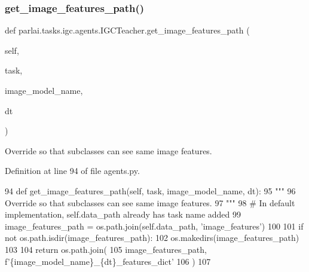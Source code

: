 \subsubsection{\texorpdfstring{get\+\_\+image\+\_\+features\+\_\+path()}{get\_image\_features\_path()}}
{\footnotesize\ttfamily def parlai.\+tasks.\+igc.\+agents.\+I\+G\+C\+Teacher.\+get\+\_\+image\+\_\+features\+\_\+path (\begin{DoxyParamCaption}\item[{}]{self,  }\item[{}]{task,  }\item[{}]{image\+\_\+model\+\_\+name,  }\item[{}]{dt }\end{DoxyParamCaption})}

\begin{DoxyVerb}Override so that subclasses can see same image features.
\end{DoxyVerb}
 

Definition at line 94 of file agents.\+py.


\begin{DoxyCode}
94     \textcolor{keyword}{def }get\_image\_features\_path(self, task, image\_model\_name, dt):
95         \textcolor{stringliteral}{"""}
96 \textcolor{stringliteral}{        Override so that subclasses can see same image features.}
97 \textcolor{stringliteral}{        """}
98         \textcolor{comment}{# In default implementation, self.data\_path already has task name added}
99         image\_features\_path = os.path.join(self.data\_path, \textcolor{stringliteral}{'image\_features'})
100 
101         \textcolor{keywordflow}{if} \textcolor{keywordflow}{not} os.path.isdir(image\_features\_path):
102             os.makedirs(image\_features\_path)
103 
104         \textcolor{keywordflow}{return} os.path.join(
105             image\_features\_path, f\textcolor{stringliteral}{'\{image\_model\_name\}\_\{dt\}\_features\_dict'}
106         )
107 
\end{DoxyCode}
\mbox{\label{classparlai_1_1tasks_1_1igc_1_1agents_1_1IGCTeacher_ac694aa2497060d57b33163868d0874d2}} 
